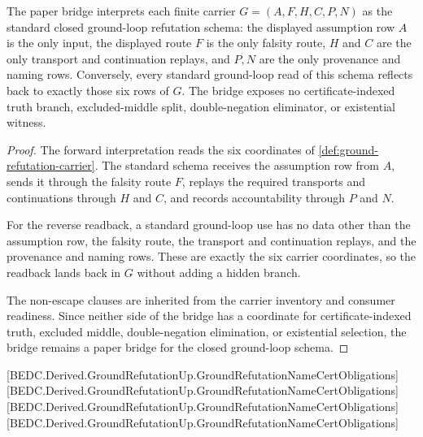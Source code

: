 \begin{theorem}
\label{thm:ground-refutation-standard-bridge}
The paper bridge interprets each finite carrier $G=(A,F,H,C,P,N)$ as the standard closed ground-loop refutation schema: the displayed assumption row $A$ is the only input, the displayed route $F$ is the only falsity route, $H$ and $C$ are the only transport and continuation replays, and $P,N$ are the only provenance and naming rows. Conversely, every standard ground-loop read of this schema reflects back to exactly those six rows of $G$. The bridge exposes no certificate-indexed truth branch, excluded-middle split, double-negation eliminator, or existential witness.
\end{theorem}
\begin{proof}
The forward interpretation reads the six coordinates of \autoref{def:ground-refutation-carrier}. The standard schema receives the assumption row from $A$, sends it through the falsity route $F$, replays the required transports and continuations through $H$ and $C$, and records accountability through $P$ and $N$.

For the reverse readback, a standard ground-loop use has no data other than the assumption row, the falsity route, the transport and continuation replays, and the provenance and naming rows. These are exactly the six carrier coordinates, so the readback lands back in $G$ without adding a hidden branch.

The non-escape clauses are inherited from the carrier inventory and consumer readiness. Since neither side of the bridge has a coordinate for certificate-indexed truth, excluded middle, double-negation elimination, or existential selection, the bridge remains a paper bridge for the closed ground-loop schema.
\end{proof}

[BEDC.Derived.GroundRefutationUp.GroundRefutationNameCertObligations]
[BEDC.Derived.GroundRefutationUp.GroundRefutationNameCertObligations]
[BEDC.Derived.GroundRefutationUp.GroundRefutationNameCertObligations]
[BEDC.Derived.GroundRefutationUp.GroundRefutationNameCertObligations]

